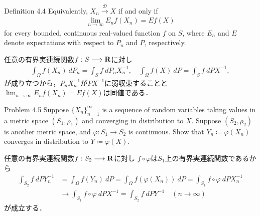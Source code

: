 	\begin{itembox}[l]{Definition 4.4}
		Equivalently, $X_n \overset{\mathscr{D}}{\longrightarrow} X$ if and only if
		\begin{align}
			\lim_{n \to \infty} E_n f(X_n) = E f(X)
		\end{align} 
		for every bounded, continuous real-valued function $f$ on $S$, 
		where $E_n$ and $E$ denote expectations with respect to $P_n$ and $P$, respectively.
	\end{itembox}
	
	\begin{prf}
		任意の有界実連続関数$f:S \longrightarrow \mathbf{R}$に対し
		\begin{align}
			\int_\Omega f(X_n)\ dP_n = \int_S f\ dP_nX_n^{-1},
			\quad \int_\Omega f(X)\ dP = \int_S f\ dPX^{-1},
		\end{align}
		が成り立つから，$P_nX_n^{-1}$が$PX^{-1}$に弱収束することと
		$\lim_{n \to \infty} E_n f(X_n) = E f(X)$は同値である．
		\QED
	\end{prf}
	
	\begin{itembox}[l]{Problem 4.5}
		Suppose $\{X_n\}_{n=1}^\infty$ is a sequence of random variables taking values 
		in a metric space $(S_1,\rho_1)$ and converging in distribution to $X$. Suppose 
		$(S_2,\rho_2)$ is another metric space, and $\varphi:S_1 \longrightarrow S_2$ 
		is continuous. Show that $Y_n \coloneqq \varphi(X_n)$ converges in distribution 
		to $Y \coloneqq \varphi(X)$.
	\end{itembox}
	
	\begin{prf}
		任意の有界実連続関数$f:S_2 \longrightarrow \mathbf{R}$に対し
		$f \circ \varphi$は$S_1$上の有界実連続関数であるから
		\begin{align}
			\int_{S_2} f\ dPY_n^{-1}
			&= \int_{\Omega} f(Y_n)\ dP
			= \int_{\Omega} f(\varphi(X_n))\ dP
			= \int_{S_1} f \circ \varphi\ dPX_n^{-1} \\
			& \longrightarrow 
			\int_{S_1} f \circ \varphi\ dPX^{-1}
			= \int_{S_2} f\ dPY^{-1}
			\quad (n \longrightarrow \infty)
		\end{align}
		が成立する．
		\QED
	\end{prf}
	
